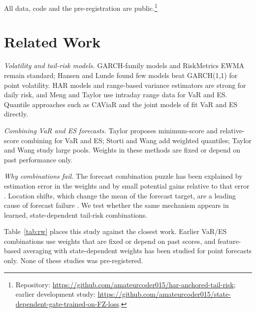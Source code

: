 \documentclass[conference]{IEEEtran}
\begin{document}
All data, code and the pre-registration are public.\footnote{Repository: \url{https://github.com/amateurcoder015/har-anchored-tail-risk}; earlier development study: \url{https://github.com/amateurcoder015/state-dependent-gate-trained-on-FZ-loss}.}

\section{Related Work}

\textit{Volatility and tail-risk models.} GARCH-family models \cite{bollerslev1986,nelson1991,glosten1993} and RiskMetrics EWMA \cite{riskmetrics1996} remain standard; Hansen and Lunde \cite{hansen2005} found few models beat GARCH(1,1) for point volatility. HAR models \cite{corsi2009} and range-based variance estimators \cite{parkinson1980,garman1980,rogers1991} are strong for daily risk, and Meng and Taylor \cite{meng2020} use intraday range data for VaR and ES. Quantile approaches such as CAViaR \cite{engle2004} and the joint models of \cite{patton2019} fit VaR and ES directly.

\textit{Combining VaR and ES forecasts.} Taylor \cite{taylor2020} proposes minimum-score and relative-score combining for VaR and ES; Storti and Wang \cite{storti2023} add weighted quantiles; Taylor and Wang \cite{taylorwang2025} study large pools. Weights in these methods are fixed or depend on past performance only.

\textit{Why combinations fail.} The forecast combination puzzle has been explained by estimation error in the weights \cite{smith2009,claeskens2016} and by small potential gains relative to that error \cite{elliott2026}. Location shifts, which change the mean of the forecast target, are a leading cause of forecast failure \cite{clements1998}. We test whether the same mechanism appears in learned, state-dependent tail-risk combinations.

Table~\ref{tab:rw} places this study against the closest work. Earlier VaR/ES combinations use weights that are fixed or depend on past scores, and feature-based averaging with state-dependent weights has been studied for point forecasts only. None of these studies was pre-registered.
\end{document}
